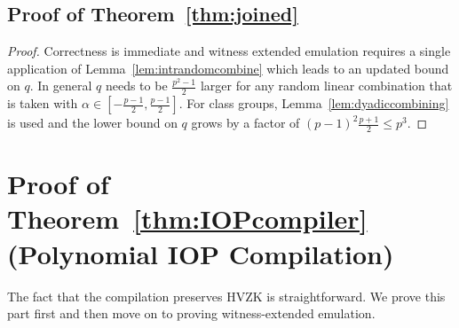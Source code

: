 \subsection{Proof of Theorem~\ref{thm:joined}} \label{appendix:joined}

\def\thetheorem{\ref{thm:joined}}
\begin{theorem}
\theoremjoined
\end{theorem}

\begin{proof}
    Correctness is immediate and witness extended emulation requires a single application of Lemma~\ref{lem:intrandomcombine} which leads to an updated bound on $q$. In general $q$ needs to be $\frac{p^2-1}{2}$ larger for any random linear combination that is taken with $\alpha \in [-\frac{p-1}{2},\frac{p-1}{2}]$. For class groups, Lemma~\ref{lem:dyadiccombining} is used and the lower bound on $q$ grows by a factor of $(p-1)^2\frac{p+1}{2}\leq p^3$.
\end{proof}



\section{Proof of Theorem~\ref{thm:IOPcompiler} (Polynomial IOP Compilation)}\label{sec:IOPcompilerproof}


\def\thetheorem{\ref{thm:IOPcompiler}}
\begin{theorem}
\theoremIOPcompiler
\end{theorem}

The fact that the compilation preserves HVZK is straightforward. We prove this part first and then move on to proving witness-extended emulation. 

